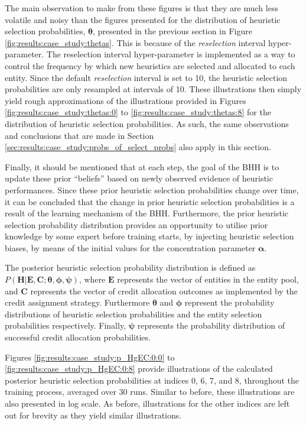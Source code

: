 The main observation to make from these figures is that they are much less volatile and noisy than the figures presented for the distribution of heuristic selection probabilities, $\boldsymbol{\theta}$, presented in the previous section in Figure \ref{fig:results:case_study:thetas}. This is because of the \textit{reselection} interval hyper-parameter. The reselection interval hyper-parameter is implemented as a way to control the frequency by which new heuristics are selected and allocated to each entity. Since the default \textit{reselection} interval is set to 10, the heuristic selection probabilities are only resampled at intervals of 10. These illustrations then simply yield rough approximations of the illustrations provided in Figures \ref{fig:results:case_study:thetas:0} to \ref{fig:results:case_study:thetas:8} for the distribution of heuristic selection probabilities. As such, the same observations and conclusions that are made in Section \ref{sec:results:case_study:probs_of_select_probs} also apply in this section.

Finally, it should be mentioned that at each step, the goal of the \acs{BHH} is to update these prior ``beliefs'' based on newly observed evidence of heuristic performances. Since these prior heuristic selection probabilities change over time, it can be concluded that the change in prior heuristic selection probabilities is a result of the learning mechanism of the \acs{BHH}. Furthermore, the prior heuristic selection probability distribution provides an opportunity to utilise prior knowledge by some expert before training starts, by injecting heuristic selection biases, by means of the initial values for the concentration parameter $\boldsymbol{\alpha}$.

The posterior heuristic selection probability distribution is defined as $P(\boldsymbol{H} \vert \boldsymbol{E}, \boldsymbol{C}; \boldsymbol{\theta}, \boldsymbol{\phi}, \boldsymbol{\psi})$, where $\boldsymbol{E}$ represents the vector of entities in the entity pool, and $\boldsymbol{C}$ represents the vector of credit allocation outcomes as implemented by the credit assignment strategy. Furthermore $\boldsymbol{\theta}$ and $\boldsymbol{\phi}$ represent the probability distributions of heuristic selection probabilities and the entity selection probabilities respectively. Finally, $\boldsymbol{\psi}$ represents the probability distribution of successful credit allocation probabilities.

Figures \ref{fig:results:case_study:p_HgEC:0:0} to \ref{fig:results:case_study:p_HgEC:0:8} provide illustrations of the calculated posterior heuristic selection probabilities at indices 0, 6, 7, and 8, throughout the training process, averaged over 30 runs. Similar to before, these illustrations are also presented in log scale. As before, illustrations for the other indices are left out for brevity as they yield similar illustrations.

